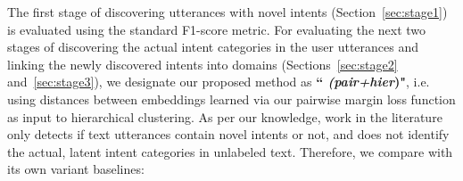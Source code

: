 

The first stage of discovering utterances with novel intents (Section~\ref{sec:stage1}) is evaluated using the standard F1-score metric. For evaluating the next two stages of discovering the actual intent categories in the user utterances and linking the newly discovered intents into domains (Sections~\ref{sec:stage2} and~\ref{sec:stage3}), we designate our proposed method as \textbf{``\mname{} \textit{(pair+hier})"}, i.e. using distances between embeddings learned via our pairwise margin loss function as input to hierarchical clustering. %
As per our knowledge, work in the literature only detects if text utterances contain novel intents or not, and does not identify the actual, latent intent categories in unlabeled text. Therefore, we compare \mname{} with its own variant baselines: %

